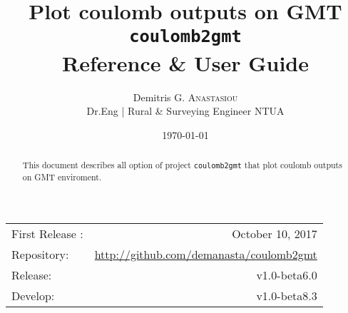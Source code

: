 \documentclass{article}
\title{Plot coulomb outputs on GMT \texttt{coulomb2gmt} \\ \large{Reference \& User Guide} } %
\author{Demitris G. \textsc{Anastasiou} \\ \normalsize{Dr.Eng | Rural \& Surveying Engineer NTUA} } %
\date{\today} %
\begin{document}
\maketitle %
\begin{center}
\vskip 1cm
\begin{tabular}{l r}
First Release : & October 10, 2017 \\
Repository:    & \url{http://github.com/demanasta/coulomb2gmt} \\
Release:        & v1.0-beta6.0\\
Develop:        & v1.0-beta8.3
\end{tabular}
\end{center}
\vfill
\begin{abstract}
{\small 
This document describes all option of project \texttt{coulomb2gmt} that plot coulomb outputs on GMT enviroment.
}
\end{abstract}
\clearpage

\tableofcontents
\clearpage


\end{document}
